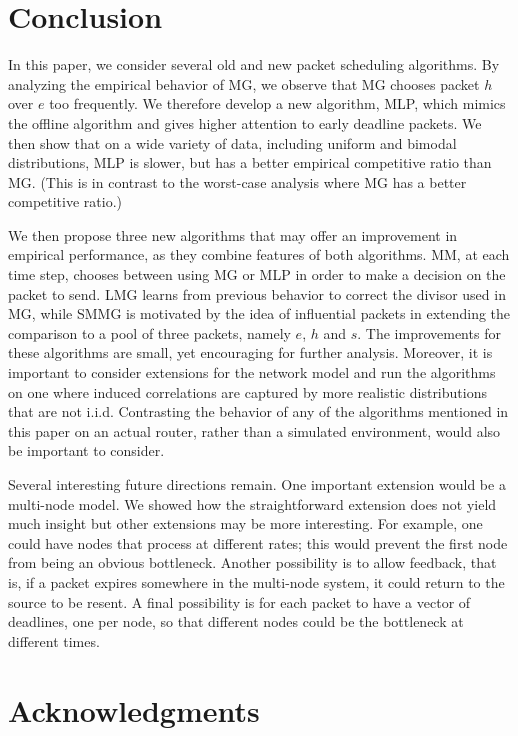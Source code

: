 \documentclass[oribibl]{llncs}
\begin{document}
\section {Conclusion}
\label{sec:Conc}
In this paper, we consider several old and new packet scheduling algorithms.
By 
analyzing the empirical behavior of MG, we observe that MG
chooses packet $h$ over $e$ too frequently. We
therefore develop a new algorithm, MLP, which
mimics the offline algorithm and gives higher attention to early
deadline packets.  We then show that on a wide variety of data, including
uniform and bimodal distributions, 
MLP is slower, but has a better empirical competitive ratio than MG. (This is in contrast to
the worst-case analysis where MG has a better competitive ratio.)

We then propose three new algorithms that may offer an improvement in
empirical performance, as they combine features of both
algorithms. MM, at each time step, chooses between using MG or MLP in
order to make a decision on the packet to send. LMG learns from
previous behavior to correct the divisor used in MG, while SMMG is
motivated by the idea of influential packets in extending the
comparison to a pool of three packets, namely $e$, $h$ and $s$. The
improvements for these algorithms are small, yet encouraging for
further analysis. Moreover, it is important to consider extensions for
the network model and run the algorithms on one where induced
correlations are captured by more realistic distributions that are not
i.i.d.  Contrasting the behavior of any of the algorithms mentioned in
this paper on an actual router, rather than a simulated environment,
would also be important to consider.


Several interesting future directions remain.  One important extension would
be a multi-node model.  We showed how the straightforward extension does not
yield much insight but other extensions may be more interesting.
For example, one could have nodes that process at different rates; this would
prevent the first node from being an obvious bottleneck.
Another possibility is to allow feedback, that is, if a packet expires somewhere in the multi-node system, it could return to the source 
to be resent.
A final  possibility is for each packet to have a vector of deadlines, one per node, so
that different nodes could be the bottleneck at different times.


\section*{Acknowledgments}
\end{document}
